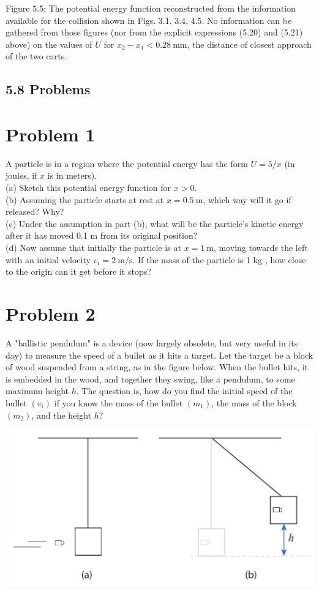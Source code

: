 \documentclass[10pt]{article}
\begin{document}
Figure 5.5: The potential energy function reconstructed from the information available for the collision shown in Figs. 3.1, 3.4, 4.5. No information can be gathered from those figures (nor from the explicit expressions (5.20) and (5.21) above) on the values of $U$ for $x_{2}-x_{1}<0.28 \mathrm{~mm}$, the distance of closest approach of the two carts.

\subsection*{5.8 Problems}
\section*{Problem 1}
A particle is in a region where the potential energy has the form $U=5 / x$ (in joules, if $x$ is in meters).\\
(a) Sketch this potential energy function for $x>0$.\\
(b) Assuming the particle starts at rest at $x=0.5 \mathrm{~m}$, which way will it go if released? Why?\\
(c) Under the assumption in part (b), what will be the particle's kinetic energy after it has moved 0.1 m from its original position?\\
(d) Now assume that initially the particle is at $x=1 \mathrm{~m}$, moving towards the left with an initial velocity $v_{i}=2 \mathrm{~m} / \mathrm{s}$. If the mass of the particle is 1 kg , how close to the origin can it get before it stops?

\section*{Problem 2}
A "ballistic pendulum" is a device (now largely obsolete, but very useful in its day) to measure the speed of a bullet as it hits a target. Let the target be a block of wood suspended from a string, as in the figure below. When the bullet hits, it is embedded in the wood, and together they swing, like a pendulum, to some maximum height $h$. The question is, how do you find the initial speed of the bullet $\left(v_{i}\right)$ if you know the mass of the bullet $\left(m_{1}\right)$, the mass of the block $\left(m_{2}\right)$, and the height $h ?$

\begin{center}
\includegraphics[max width=\textwidth]{2024_09_14_9969b06773f10b6936e8g-127}
\end{center}
\end{document}
